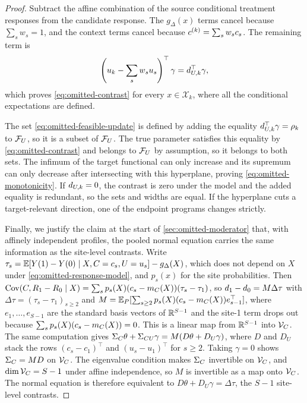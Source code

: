 \begin{proof}
Subtract the affine combination of the source conditional treatment
responses from the candidate response. The $g_\Delta(x)$ terms cancel because
$\sum_s w_s=1$, and the context terms cancel because
$c^{(k)}=\sum_s w_sc_s$. The remaining term is
\[
  \left(u_k-\sum_s w_su_s\right)^\top\gamma
  =d_{U,k}^\top\gamma,
\]
which proves \eqref{eq:omitted-contrast} for every $x\in\mathcal X_k$,
where all the conditional expectations are defined.

The set \eqref{eq:omitted-feasible-update} is defined by adding the
equality $d_{U,k}^\top\gamma=\rho_k$ to $\mathcal F_U$, so it is a subset of
$\mathcal F_U$. The true parameter satisfies this equality by
\eqref{eq:omitted-contrast} and belongs to $\mathcal F_U$ by assumption, so it
belongs to both sets. The infimum of the target functional can only
increase and its supremum can only decrease after intersecting with this
hyperplane, proving \eqref{eq:omitted-monotonicity}. If $d_{U,k}=0$, the
contrast is zero under the model and the added equality is redundant, so the
sets and widths are equal. If the hyperplane cuts a target-relevant direction,
one of the endpoint programs changes strictly.

Finally, we justify the claim at the start of \cref{sec:omitted-moderator}
that, with affinely independent profiles, the pooled normal equation
carries the same information as the site-level contrasts. Write
$\tau_s=\mathbb{E}[Y(1)-Y(0)\mid X,C=c_s,U=u_s]-g_\Delta(X)$, which does not depend
on $X$ under \eqref{eq:omitted-response-model}, and $p_s(x)$ for the site
probabilities. Then
${\rm Cov}(C,R_{1}-R_{0}\mid X)=\sum_sp_s(X)(c_s-m_C(X))(\tau_s-\tau_1)$,
so $d_{1}-d_{0}=M\Delta\tau$ with $\Delta\tau=(\tau_s-\tau_1)_{s\geq2}$
and $M=\mathbb{E}_P[\sum_{s\geq2}p_s(X)(c_s-m_C(X))e_{s-1}^\top]$, where
$e_1,\ldots,e_{S-1}$ are the standard basis vectors of $\mathbb{R}^{S-1}$ and
the site-1 term drops out because $\sum_sp_s(X)(c_s-m_C(X))=0$. This is a linear map from
$\mathbb{R}^{S-1}$ into $\mathcal V_C$. The same computation gives
$\Sigma_C\theta+\Sigma_{CU}\gamma=M(D\theta+D_U\gamma)$, where $D$ and $D_U$ stack
the rows $(c_s-c_1)^\top$ and $(u_s-u_1)^\top$ for $s\geq2$. Taking
$\gamma=0$ shows $\Sigma_C=MD$ on $\mathcal V_C$. The eigenvalue condition makes
$\Sigma_C$ invertible on $\mathcal V_C$, and $\dim\mathcal V_C=S-1$ under affine
independence, so $M$ is invertible as a map onto $\mathcal V_C$. The normal
equation is therefore equivalent to $D\theta+D_U\gamma=\Delta\tau$, the
$S-1$ site-level contrasts.
\end{proof}


